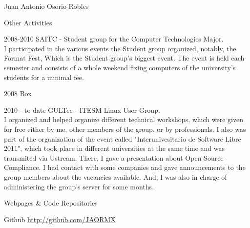 \documentclass[spanish,10pt,letterpaper]{article}
\begin{document}
\begin{cv}{Juan Antonio Osorio-Robles}
	\begin{cvlist}{Other Activities}
		\item [2008-2010] SAITC - Student group for the Computer Technologies Major.\\
			I participated in the various events the Student group organized, notably, the Format Fest, Which is the Student group's biggest event. The event is held each semester and consists of a whole weekend fixing computers of the university's students for a minimal fee. 
		\item [2008] Box
		\item [2010 - to date] GULTec - ITESM Linux User Group.\\
			I organized and helped organize different technical workshops, which were given for free either by me, other members of the group, or by professionals. I also was part of the organization of the event called "Interunivesitario de Software Libre 2011", which took place in different universities at the same time and was transmited via Ustream. There, I gave a presentation about Open Source Compliance. I had contact with some companies and gave announcements to the group members about the vacancies available. And, I was also in charge of administering the group's server for some months.
	\end{cvlist}

	\begin{cvlist}{Webpages \& Code Repositories}
		\item [Github] \href{http://github.com/JAORMX}{http://github.com/JAORMX}
	\end{cvlist}
	
	
	
\end{cv}


\end{document}
